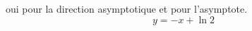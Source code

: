 oui pour la direction asymptotique et pour l'asymptote.
\begin{displaymath}
 y = -x +\ln 2
\end{displaymath}
